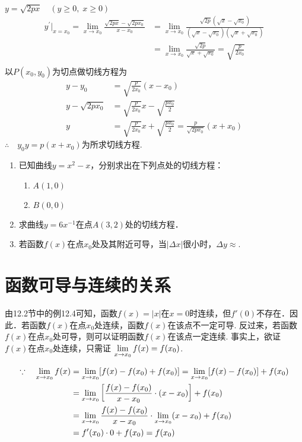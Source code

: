\begin{solution}
$y=\sqrt{2px}\quad (y\ge 0,\; x\ge 0)$
\[\begin{split}
    y^{\prime}\Big|_{x=x_{0}}=\lim_{x\to x_{0}}\frac{\sqrt{2px}-\sqrt{2px_{0}}}{x-x_{0}}&=\lim_{x\to x_{0}}\frac{\sqrt{2p}(\sqrt{x}-\sqrt{x_{0}})}{(\sqrt{x}-\sqrt{x_{0}})(\sqrt{x}+\sqrt{x_{0}})}\\
    &=\lim_{x\to x_{0}}\frac{\sqrt{2p}}{\sqrt{x}+\sqrt{x_{0}}}=\sqrt{\frac{p}{2x_{0}}}\\
\end{split}\]
以$P(x_0,y_0)$为切点做切线方程为
\[\begin{split}
    y-y_0&=\sqrt{\frac{p}{2x_0}}(x-x_0)\\
    y-\sqrt{2px_0}&=\sqrt{\frac{p}{2x_0}}x-\sqrt{\frac{px_0}{2}}\\
y&=\sqrt{\frac p{2x_{0}}}x+\sqrt{\frac{px_{0}}2}=\frac{p}{\sqrt{2px_{0}}}(x+x_{0})
\end{split}\]
$\therefore\quad y_{0}y= p( x+ x_{0})$为所求切线方程.
\end{solution}

\begin{ex}
\begin{enumerate}
    \item 已知曲线$y=x^2-x$，分别求出在下列点处的切线方程：
\begin{multicols}{2}
\begin{enumerate}[(1)]
    \item $A(1,0)$
    \item $B(0,0)$
\end{enumerate}
\end{multicols}
    \item 求曲线$y=6x^{-1}$在点$A(3,2)$处的切线方程．
    \item 若函数$f(x)$在点$x_0$处及其附近可导，当$|\Delta x|$很小时，$\Delta y\approx$\blank .
\end{enumerate}
\end{ex}

\section{函数可导与连续的关系}
由12.2节中的例12.4可知，函数$f(x)=|x|$在$x=0$时连续，但$f'(0)$不存在．因此．若函数$f(x)$在点$x_0$处连续，函数$f(x)$在该点不一定可导. 反过来，若函数$f(x)$在点$x_0$处可导，则可以证明函数$f(x)$在该点一定连续. 事实上，欲证$f(x)$在点$x_0$处连续，只需证
$\lim\limits_{x\to x_0}f(x)=f(x_0)$.

\[\begin{split}
\because\quad \lim\limits_{x\to x_0}f(x)&=\lim\limits_{x\to x_0}[f(x)-f(x_0)+f(x_0)]=\lim\limits_{x\to x_0}[f(x)-f(x_0)]+f(x_0)\\
&=\lim\limits_{x\to x_0}\left[\dfrac{f(x)-f(x_0)}{x-x_0}\cdot (x-x_0)\right]+f(x_0)\\
&=\lim\limits_{x\to x_0} \dfrac{f(x)-f(x_0)}{x-x_0}  \cdot \lim\limits_{x\to x_0}(x-x_0)+f(x_0)\\
&=f'(x_0)\cdot 0+f(x_0) =f(x_0)
\end{split}\]

